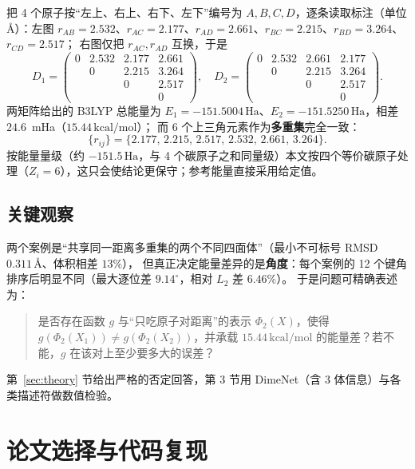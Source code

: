 \documentclass[UTF8,a4paper,11pt]{ctexart}
\newcommand{\ha}{\,\mathrm{Ha}}
\newcommand{\kcal}{\,\mathrm{kcal/mol}}
\newcommand{\ang}{\,\text{\AA}}
\begin{document}
把 4 个原子按“左上、右上、右下、左下”编号为 $A,B,C,D$，逐条读取标注（单位 \AA）：左图
$r_{AB}=2.532$、$r_{AC}=2.177$、$r_{AD}=2.661$、$r_{BC}=2.215$、$r_{BD}=3.264$、$r_{CD}=2.517$；
右图仅把 $r_{AC},r_{AD}$ 互换，于是
\begin{equation}
D_1=\begin{pmatrix}
0&2.532&2.177&2.661\\
 &0&2.215&3.264\\
 &&0&2.517\\
 &&&0
\end{pmatrix},\quad
D_2=\begin{pmatrix}
0&2.532&2.661&2.177\\
 &0&2.215&3.264\\
 &&0&2.517\\
 &&&0
\end{pmatrix}.
\end{equation}
两矩阵给出的 B3LYP 总能量为 $E_1=-151.5004\ha$、$E_2=-151.5250\ha$，相差 $24.6$~mHa（$15.44\kcal$）；
而 6 个上三角元素作为\textbf{多重集}完全一致：
\begin{equation}
\{r_{ij}\}=\{2.177,\,2.215,\,2.517,\,2.532,\,2.661,\,3.264\}.
\end{equation}
按能量量级（约 $-151.5\ha$，与 4 个碳原子之和同量级）本文按四个等价碳原子处理（$Z_i=6$），这只会使结论更保守；参考能量直接采用给定值。

\subsection{关键观察}
两个案例是“共享同一距离多重集的两个不同四面体”（最小不可标号 RMSD $0.311\ang$、体积相差 $13\%$），
但真正决定能量差异的是\textbf{角度}：每个案例的 12 个键角排序后明显不同（最大逐位差 $9.14^\circ$，相对 $L_2$ 差 $6.46\%$）。
于是问题可精确表述为：
\begin{quote}
是否存在函数 $g$ 与“只吃原子对距离”的表示 $\Phi_2(X)$，使得 $g(\Phi_2(X_1))\neq g(\Phi_2(X_2))$，并承载 $15.44\kcal$ 的能量差？若不能，$g$ 在该对上至少要多大的误差？
\end{quote}
第~\ref{sec:theory} 节给出严格的否定回答，第 3 节用 DimeNet（含 3 体信息）与各类描述符做数值检验。

\section{论文选择与代码复现}
\end{document}
